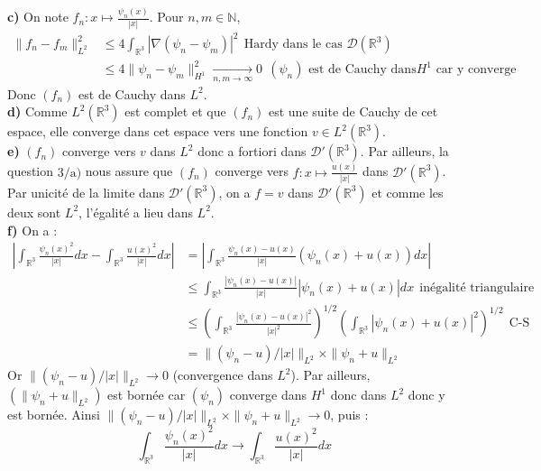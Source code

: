 \documentclass[a4paper,12pt]{article}
\begin{document}
\textbf{c)} On note $f_n:x \mapsto \frac{\psi_n(x)}{|x|}$. Pour $n,m \in \mathbb{N}$,
\begin{align*}
\|f_n-f_m\|_{L^2}^2 & \leq 4 \int_{\mathbb{R}^3} |\nabla (\psi_n - \psi_m)|^2 \ \ \text{Hardy dans le cas } \mathcal{D}(\mathbb{R}^3) \\
& \leq 4 \|\psi_n - \psi_m \|_{H^1}^2 \underset{n,m \to \infty}{\longrightarrow} 0 \ \ (\psi_n) \text{ est de Cauchy dans} H^1 \text{ car y converge}
\end{align*}
Donc $(f_n)$ est de Cauchy dans $L^2$. \\

\textbf{d)} Comme $L^2(\mathbb{R}^3)$ est complet et que $(f_n)$ est une suite de Cauchy de cet espace, elle converge dans cet espace vers une fonction $v \in L^2(\mathbb{R}^3)$. \\

\textbf{e)} $(f_n)$ converge vers $v$ dans $L^2$ donc a fortiori dans $\mathcal{D}'(\mathbb{R}^3)$. Par ailleurs, la question $\text{3/a)}$ nous assure que $(f_n)$ converge vers $f:x \mapsto \frac{u(x)}{|x|}$ dans $\mathcal{D}'(\mathbb{R}^3)$. Par unicité de la limite dans $\mathcal{D}'(\mathbb{R}^3)$, on a $f=v$ dans $\mathcal{D}'(\mathbb{R}^3)$ et comme les deux sont $L^2$, l'égalité a lieu dans $L^2$. \\

\textbf{f)} On a :
\begin{align*}
\left| \int_{\mathbb{R}^3} \frac{\psi_n(x)^2}{|x|} dx -  \int_{\mathbb{R}^3} \frac{u(x)^2}{|x|} dx \right| & = \left| \int_{\mathbb{R}^3} \frac{\psi_n(x)-u(x)}{|x|}(\psi_n(x)+u(x)) dx \right| \\
& \leq \int_{\mathbb{R}^3} \frac{|\psi_n(x)-u(x)|}{|x|}|\psi_n(x)+u(x)| dx \ \ \text{inégalité triangulaire} \\
& \leq \left( \int_{\mathbb{R}^3} \frac{|\psi_n(x)-u(x)|^2}{|x|^2} \right)^{1/2} \left( \int_{\mathbb{R}^3} |\psi_n(x)+u(x)|^2 \right)^{1/2} \ \ \text{C-S} \\
&\boxed{ = \| (\psi_n-u)/|x| \|_{L^2} \times \| \psi_n + u \|_{L^2}}
\end{align*}
Or $\| (\psi_n-u)/|x| \|_{L^2} \rightarrow 0$ (convergence dans $L^2$). Par ailleurs, $(\| \psi_n + u \| _{L^2})$ est bornée car $(\psi_n)$ converge dans $H^1$ donc dans $L^2$ donc y est bornée.
Ainsi $\| (\psi_n-u)/|x| \|_{L^2} \times \| \psi_n + u \|_{L^2} \rightarrow 0$, puis :
$$\boxed{\int_{\mathbb{R}^3} \frac{\psi_n(x)^2}{|x|} dx \longrightarrow \int_{\mathbb{R}^3} \frac{u(x)^2}{|x|} dx}$$ \\
\end{document}
